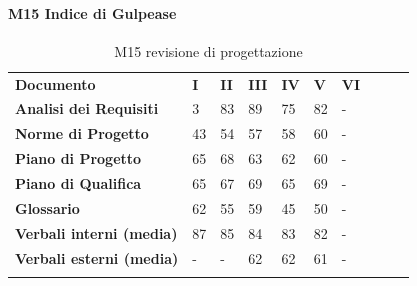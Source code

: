\paragraph{M15 Indice di Gulpease} \mbox{}
\begin{longtable} {						
		>{}p{50mm}  		
		>{}p{8mm}		
		>{}p{8mm}		
		>{}p{8mm}		
		>{}p{8mm}		
		>{}p{8mm}		
		>{}p{8mm}
		>{}p{8mm}
		>{}p{8mm}
		>{}p{8mm}				
	}			
	\rowcolor{gray!50}
	\textbf{Documento} & \textbf{I} & \textbf{II} & \textbf{III} & \textbf{IV} & \textbf{V} & \textbf{VI} \TBstrut \\ [2mm]
	\textbf{Analisi dei Requisiti} & 3 & 83 & 89 & 75 & 82 & - \TBstrut \\ [2mm]
	\textbf{Norme di Progetto} & 43 & 54 & 57 & 58 & 60 & - \TBstrut \\ [2mm]
	\textbf{Piano di Progetto} & 65 & 68 & 63 & 62 & 60 & - \TBstrut \\ [2mm]
	\textbf{Piano di Qualifica} & 65 & 67 & 69 & 65 & 69 & - \TBstrut \\ [2mm]
	\textbf{Glossario} & 62 & 55 & 59 & 45 & 50 & - \TBstrut \\ [2mm]
	\textbf{Verbali interni (media)} & 87 & 85 & 84 & 83 & 82 & - \TBstrut \\ [2mm]
	\textbf{Verbali esterni (media)} & - & - & 62 & 62 & 61 & - \TBstrut \\ [2mm]
	\rowcolor{white}
	\caption{M15 revisione di progettazione}
\end{longtable}

